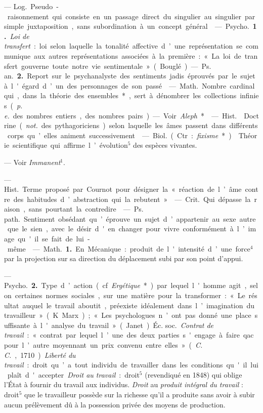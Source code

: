 \begin{itemize}[leftmargin=1cm, label=, itemsep=1pt]
 — \si{Log.} Pseudo-raisonnement qui consiste en un passage
direct du singulier au singulier par simple juxtaposition, sans subordination
à un concept général.

 — \si{Psycho.} {\bf 1.} {\it Loi de transfert} : loi selon
laquelle la tonalité affective d’une représentation se communique aux autres
représentations associées à la première : « La loi de transfert gouverne
toute notre vie sentimentale » (Bouglé). — \si{Ps. an.} {\bf 2.} Report sur
le psychanalyste des sentiments jadis éprouvés par le sujet à l'égard d’un
des personnages de son passé.

 — \si{Math.} Nombre cardinal qui, dans la théorie des
ensembles*, sert à dénombrer les collections infinies ({\it p. e.} des
nombres entiers, des nombres pairs). — Voir {\it Aleph}*.

 — \si{Hist.}  Doctrine
({\it not.} des pythagoriciens) selon laquelle les âmes passent dans
différents corps qu’elles animent successivement.

 — \si{Biol.} (Ctr. : {\it fixisme}*). 
Théorie scientifique qui affirme l’évolution$^5$ des espèces vivantes.

 — Voir {\it Immanent}$^1$.

 — \si{Hist.} Terme proposé par Cournot pour désigner
la « réaction de l’âme contre des habitudes d’abstraction qui la rebutent ».

 — \si{Crit.} Qui dépasse
la raison, sans pourtant la contredire.

 — \si{Ps. path.} Sentiment obsédant qu’éprouve un sujet
d’appartenir au sexe autre que le sien, avec le désir d'en changer pour vivre
conformément à l’image qu'il se fait de lui-même.

 — \si{Math.} {\bf 1.} En Mécanique : produit de l'intensité
d’une force$^4$ par la projection sur sa direction du déplacement subi par
son point d'appui.

— \si{Psycho.} {\bf 2.} Type d’action (cf. {\it Ergétique}*) par lequel
l'homme agit, selon certaines normes sociales, sur une matière pour la
transformer : « Le résultat auquel le travail aboutit, préexiste idéalement
dans l’imagination du travailleur » (K. Marx) ; « Les psychologues n’ont pas
donné une place suffisante à l'analyse du travail » (Janet). \si{Éc. soc.}
{\it Contrat de travail} : « contrat par lequel l’une des deux parties
s'engage à faire qac. pour l’autre moyennant un prix convenu entre elles
» ({\it C. C.}, 1710). {\it Liberté du travail} : droit qu’a tout individu de
travailler dans les conditions qu'il lui plaît d'accepter. {\it Droit au
travail} : droit$^5$ (revendiqué en 1848) qui oblige l'État à fournir du
travail aux individus. {\it Droit} au {\it produit intégral du travail} :
droit$^5$
que le travailleur possède sur la richesse qu’il a produite sans avoir à
subir aucun prélèvement dû à la possession privée des moyens de production.


\end{itemize}

